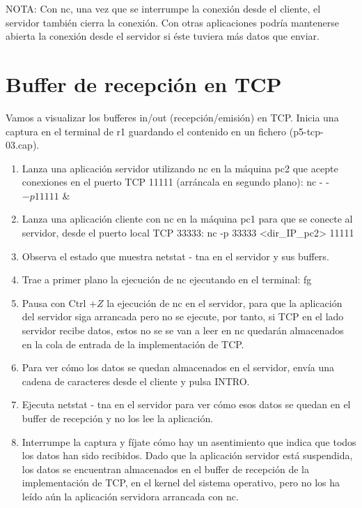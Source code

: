 \documentclass[12pt, a4paper]{report}
\begin{document}
NOTA: Con nc, una vez que se interrumpe la conexión desde el cliente, el servidor también cierra la conexión. Con otras aplicaciones podría mantenerse abierta la conexión desde el servidor si éste tuviera más datos que enviar.

\section{Buffer de recepción en TCP}
Vamos a visualizar los bufferes in/out (recepción/emisión) en TCP. Inicia una captura en el terminal de r1 guardando el contenido en un fichero (p5-tcp-03.cap).

\begin{enumerate}
	\item Lanza una aplicación servidor utilizando nc en la máquina pc2 que acepte conexiones en el puerto TCP 11111 (arráncala en segundo plano): nc - - $-p 11111$ \&
	
	\item Lanza una aplicación cliente con nc en la máquina pc1 para que se conecte al servidor, desde el puerto local TCP 33333: nc -p 33333 <dir\_IP\_pc2> 11111
	
	\item Observa el estado que muestra netstat - tna en el servidor y sus buffers.
	
	\item Trae a primer plano la ejecución de nc ejecutando en el terminal: fg
	
	\item Pausa con Ctrl $+Z$ la ejecución de nc en el servidor, para que la aplicación del servidor siga arrancada pero no se ejecute, por tanto, si TCP en el lado servidor recibe datos, estos no se se van a leer en nc quedarán almacenados en la cola de entrada de la implementación de TCP.
	
	\item Para ver cómo los datos se quedan almacenados en el servidor, envía una cadena de caracteres desde el cliente y pulsa INTRO.
	
	\item Ejecuta netstat - tna en el servidor para ver cómo esos datos se quedan en el buffer de recepción y no los lee la aplicación.
	
	\item Interrumpe la captura y fíjate cómo hay un asentimiento que indica que todos los datos han sido recibidos. Dado que la aplicación servidor está suspendida, los datos se encuentran almacenados en el buffer de recepción de la implementación de TCP, en el kernel del sistema operativo, pero no los ha leído aún la aplicación servidora arrancada con nc.
	

\end{enumerate}
\end{document}
